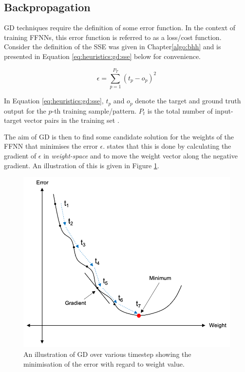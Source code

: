 \subsection{Backpropagation}
\label{sec:heuristics:gd:backpropagation}

\Ac{GD} techniques require the definition of some error function. In the context of training \acp{FFNN}, this error function is referred to as a loss/cost function. Consider the definition of the \ac{SSE} was given in Chapter\ref{algo:bhh} and is presented in Equation \ref{eq:heuristics:gd:sse} below for convenience.

\begin{equation}
      \label{eq:heuristics:gd:sse}
      \epsilon = \sum^{P_{T}}_{p=1}(t_{p} - o_{p})^{2}
\end{equation}

In Equation \ref{eq:heuristics:gd:sse}, $t_{p}$ and $o_{p}$ denote the target and ground truth output for the $p$-th training sample/pattern. $P_{t}$ is the total number of input-target vector pairs in the training set \cite{ref:engelbrecht:2007}.

The aim of \ac{GD} is then to find some candidate solution for the weights of the \ac{FFNN} that minimises the error $\epsilon$. \citeauthor{ref:engelbrecht:2007} \cite{ref:engelbrecht:2007} states that this is done by calculating the gradient of $\epsilon$ in \textit{weight-space} and to move the weight vector along the negative gradient. An illustration of this is given in Figure \ref{fig:heuristics:gd:gd_illustration}.

\begin{figure}[htbp]
      \includegraphics[width=\textwidth]{images/gradient_descent.png}
      \caption{An illustration of \ac{GD} over various timestep showing the minimisation of the error with regard to weight value.}
      \label{fig:heuristics:gd:gd_illustration}
\end{figure}


